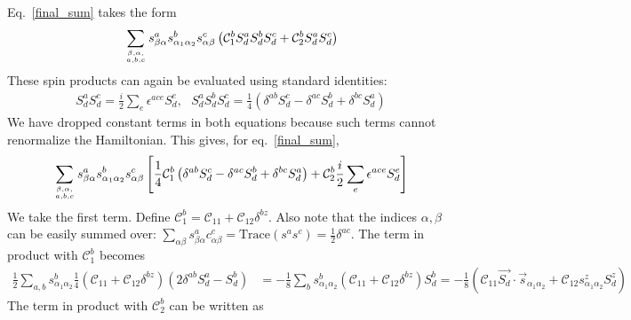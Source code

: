\documentclass{revtex4-2}
\numberwithin{equation}{section}
\begin{document}
Eq.~\ref{final_sum} takes the form
\begin{equation}\begin{aligned}
	\sum_{\beta,\alpha, \atop{a,b,c}}s^a_{\beta \alpha} s^b_{\alpha_1 \alpha_2}s^c_{\alpha \beta}\left(\mathcal{C}_1^b S_d^a S_d^b S_d^c+ \mathcal{C}_2^b S_d^a S_d^c\right)  
\end{aligned}\end{equation}
These spin products can again be evaluated using standard identities:
\begin{equation}\begin{aligned}
	S_d^a S_d^c = \frac{i}{2}\sum_{e}\epsilon^{ace}S_d^e, ~ ~ ~ S_d^a S_d^b S_d^c = \frac{1}{4}\left(\delta^{ab}S_d^c - \delta^{ac}S_d^b + \delta^{bc}S_d^a\right) 
\end{aligned}\end{equation}
We have dropped constant terms in both equations because such terms cannot renormalize the Hamiltonian. This gives, for eq.~\ref{final_sum},
\begin{equation}\begin{aligned}
	\label{Cb1Cb2}
	\sum_{\beta,\alpha, \atop{a,b,c}}s^a_{\beta \alpha} s^b_{\alpha_1 \alpha_2}s^c_{\alpha \beta}\left[\frac{1}{4}\mathcal{C}_1^b \left(\delta^{ab}S_d^c - \delta^{ac}S_d^b + \delta^{bc}S_d^a\right)+ \mathcal{C}_2^b \frac{i}{2}\sum_{e}\epsilon^{ace}S_d^e\right]
\end{aligned}\end{equation}
We take the first term. Define \(\mathcal{C}^b_1 = \mathcal{C}_{11} + \mathcal{C}_{12}\delta^{bz}\). Also note that the indices \(\alpha,\beta\) can be easily summed over: \(\sum_{\alpha\beta}s^a_{\beta\alpha}c^c_{\alpha\beta} = \text{Trace}\left(s^a s^c\right) = \frac{1}{2}\delta^{ac}\). The term in product with \(\mathcal{C}^b_1\) becomes
\begin{equation}\begin{aligned}
	\label{Cb1}
	\frac{1}{2}\sum_{a,b}s^b_{\alpha_1 \alpha_2}\frac{1}{4}\left(\mathcal{C}_{11} + \mathcal{C}_{12}\delta^{bz}\right) \left(2\delta^{ab}S_d^a - S_d^b\right) &= -\frac{1}{8}\sum_{b}s^b_{\alpha_1 \alpha_2}\left(\mathcal{C}_{11} + \mathcal{C}_{12}\delta^{bz}\right)S_d^b = -\frac{1}{8}\left(\mathcal{C}_{11} \vec{S_d}\cdot\vec{s}_{\alpha_1\alpha_2} + \mathcal{C}_{12}s^z_{\alpha_1\alpha_2}S_d^z\right)
\end{aligned}\end{equation}
The term in product with \(\mathcal{C}^b_2\) can be written as
\end{document}

